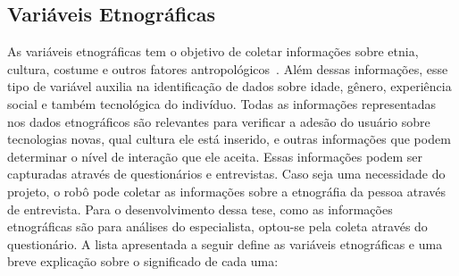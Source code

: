 \subsection{Variáveis Etnográficas}
\label{sec:etnograficas}
As variáveis etnográficas tem o objetivo de coletar informações sobre etnia, cultura, costume e outros fatores antropológicos~\cite{borges:2005}. Além dessas informações, esse tipo de variável auxilia na identificação de dados sobre idade, gênero, experiência social e também tecnológica do indivíduo. Todas as informações representadas nos dados etnográficos são relevantes para verificar a adesão do usuário sobre tecnologias novas, qual cultura ele está inserido, e outras informações que podem determinar o nível de interação que ele aceita. Essas informações podem ser capturadas através de questionários e entrevistas. Caso seja uma necessidade do projeto, o robô pode coletar as informações sobre a etnográfia da pessoa através de entrevista. Para o desenvolvimento dessa tese, como as informações etnográficas são para análises do especialista, optou-se pela coleta através do questionário. A lista apresentada a seguir define as variáveis etnográficas e uma breve explicação sobre o significado de cada uma:

